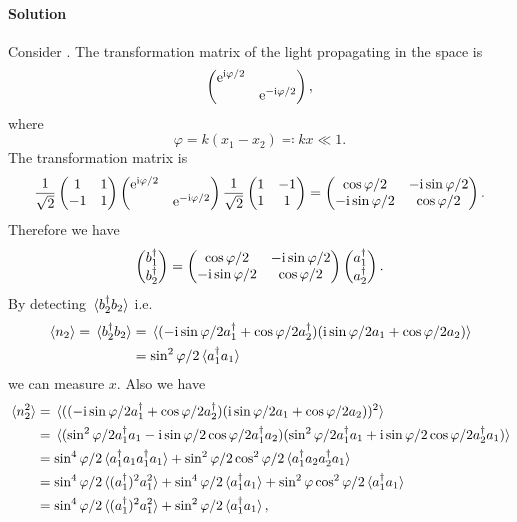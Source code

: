\documentclass[hyperref, a4paper]{article}
\newcommand*{\ii}{\mathrm{i}}
\newcommand*{\ee}{\mathrm{e}}
\begin{document}
\paragraph{Solution} Consider . The transformation matrix of the light propagating in the space 
is 
\[
    \pmqty{\dmat{\ee^{\ii \varphi / 2}, \ee^{- \ii \varphi / 2}}},
\] 
where 
\begin{equation}
    \varphi = k (x_1 - x_2) \eqqcolon k x \ll 1.
\end{equation}
The transformation matrix is 
\[
    \frac{1}{\sqrt{2}} \pmqty{1 & 1 \\ -1 & 1}  \pmqty{\dmat{\ee^{\ii \varphi / 2}, \ee^{- \ii \varphi / 2}}} \frac{1}{\sqrt{2}} \pmqty{1 & -1 \\ 1 & 1} = \pmqty{\cos \varphi / 2 & - \ii \sin \varphi / 2 \\ - \ii \sin \varphi / 2 & \cos \varphi / 2}.
\]
Therefore we have 
\begin{equation}
    \pmqty{ b^\dagger_1 \\ b^\dagger_2 } = \pmqty{\cos \varphi / 2 & - \ii \sin \varphi / 2 \\ - \ii \sin \varphi / 2 & \cos \varphi / 2} \pmqty{ a^\dagger_1 \\ a^\dagger_2 }.
\end{equation}
By detecting $\expval*{b_2^\dagger b_2}$ i.e. 
\begin{equation}
    \begin{aligned}
        \expval*{n_2} = \expval*{b_2^\dagger b_2} &= \expval*{(- \ii \sin \varphi / 2 a_1^\dagger + \cos \varphi / 2 a_2^\dagger) (\ii \sin \varphi / 2 a_1 + \cos \varphi / 2 a_2)} \\
        &= \sin^2 \varphi / 2 \expval*{a_1^\dagger a_1}
    \end{aligned}
\end{equation}
we can measure $x$. Also we have  
\[
    \begin{aligned}
        \expval*{n_2^2} &= \expval*{((- \ii \sin \varphi / 2 a_1^\dagger + \cos \varphi / 2 a_2^\dagger) (\ii \sin \varphi / 2 a_1 + \cos \varphi / 2 a_2))^2} \\
        &= \expval*{(\sin^2 \varphi / 2 a_1^\dagger a_1 - \ii \sin \varphi / 2 \cos \varphi / 2 a_1^\dagger a_2) (\sin^2 \varphi / 2 a_1^\dagger a_1 + \ii \sin \varphi / 2 \cos \varphi / 2 a_2^\dagger a_1)} \\
        &= \sin^4 \varphi / 2 \expval*{ a_1^\dagger a_1 a_1^\dagger a_1} + \sin^2 \varphi / 2 \cos^2 \varphi/2 \expval*{a_1^\dagger a_2 a_2^\dagger a_1} \\
        &= \sin^4 \varphi / 2 \expval*{(a_1^\dagger)^2 a_1^2} + \sin^4 \varphi / 2  \expval*{a_1^\dagger a_1} + \sin^2 \varphi \cos^2 \varphi / 2 \expval*{a_1^\dagger a_1} \\
        &= \sin^4 \varphi / 2 \expval*{(a_1^\dagger)^2 a_1^2} + \sin^2 \varphi / 2  \expval*{a_1^\dagger a_1} ,
    \end{aligned}
\]
\end{document}

